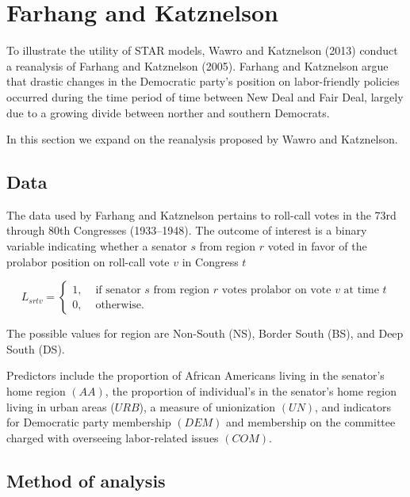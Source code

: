\chapter{Farhang and Katznelson}

To illustrate the utility of STAR models, Wawro and Katznelson (2013) conduct a reanalysis of Farhang and Katznelson (2005). Farhang and Katznelson argue that drastic changes in the Democratic party's position on labor-friendly policies occurred during the time period of time between New Deal and Fair Deal, largely due to a growing divide between norther and southern Democrats. 

In this section we expand on the reanalysis proposed by Wawro and Katznelson. 


\section{Data} 

The data used by Farhang and Katznelson pertains to roll-call votes in the 73rd through 80th Congresses (1933--1948). The outcome of interest is a binary variable indicating whether a senator $s$ from region $r$ voted in favor of the prolabor position on roll-call vote $v$ in Congress $t$

$$L_{srtv} = 
\begin{cases}
1, & \text{ if senator $s$ from region $r$ votes prolabor on vote $v$ at time $t$} \\
0, & \text{ otherwise.}
\end{cases}
$$

The possible values for region are Non-South (NS), Border South (BS), and Deep South (DS). 

Predictors include the proportion of African Americans living in the senator's home region $(AA)$, the proportion of individual's in the senator's home region living in urban areas ($URB$), a measure of unionization 
$(UN)$, and indicators for Democratic party membership $(DEM)$ and membership on the committee charged with overseeing labor-related issues $(COM)$.  %



\section{Method of analysis}


